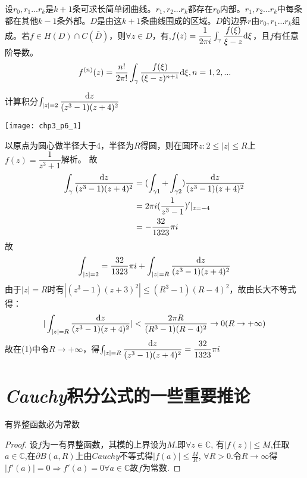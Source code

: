 \begin{mypro}
	设$r_0,r_1...r_k$是$k+1$条可求长简单闭曲线。$r_1,r_2...r_k$都存在$r_0$内部。$r_1,r_2...r_k$中每条都在其他$k-1$条外部。$D$是由这$k+1$条曲线围成的区域。$D$的边界$r$由$r_0,r_1...r_k$组成。若$f\in H(D)\cap C(\bar{D})$，则$\forall z\in D$，有,$f(z)=\dfrac{1}{2\pi i}\int_\gamma\dfrac{f(\xi)}{\xi-z}\mathrm{d}\xi$，且$f$有任意阶导数。
	\[f^{(n)}(z)=\dfrac{n!}{2\pi!}\int_\gamma\dfrac{f(\xi)}{(\xi-z)^{n+1}}\mathrm{d}\xi, n=1,2,...\]
\end{mypro}

\begin{eg}
	计算积分$\int_{|z|=2}\dfrac{\mathrm{d}z}{(z^3-1)(z+4)^2}$
	\begin{center}
		\texttt{[image: chp3\_p6\_1]}
	\end{center}
	
	以原点为圆心做半径大于4，半径为$R$得圆，则在圆环${z:2\leq|z|\leq R}$上$f(z)=\dfrac{1}{z^3+1}$解析。
	故
	\begin{align*}
	\int_\gamma\dfrac{\mathrm{d}z}{(z^3-1)(z+4)^2}&=(\int_{\gamma 1}+\int_{\gamma 2})\dfrac{\mathrm{d}z}{(z^3-1)(z+4)^2}\\
	&=2\pi i(\dfrac{1}{z^3-1})'|_{z=-4}\\
	&=-\dfrac{32}{1323}\pi i
	\end{align*}
	故\begin{equation}
	\int_{|z|=2}=\dfrac{32}{1323}\pi i+\int_{|z|=R}\dfrac{\mathrm{d}z}{(z^3-1)(z+4)^2}
	\end{equation}
	由于$|z|=R$时有$|(z^3-1)(z+3)^2|\leq(R^3-1)(R-4)^2$，故由长大不等式得：
	\[|\int_{|z|=R}\dfrac{\mathrm{d}z}{(z^3-1)(z+4)^2}|<\dfrac{2\pi R}{(R^3-1)(R-4)^2}\to 0(R\to+\infty)\]
	故在(1)中令$R\to+\infty$，得$\int_{|z|=R}\dfrac{\mathrm{d}z}{(z^3-1)(z+4)^2}=\dfrac{32}{1323}\pi i$
	
\end{eg}







\section{\emph{Cauchy}积分公式的一些重要推论}

\begin{mypro}
	有界整函数必为常数
\end{mypro}
\begin{proof}
	设$f$为一有界整函数，其模的上界设为$M$.即$\forall z\in\mathbb{C}$,
	有$|f(z)|\leq M$,任取$a\in\mathbb{C}$,在$\partial$$B(a,R)$上由$Cauchy$不等式得$\displaystyle{|f(a)|\le\frac{M}{R}}$,
	$\forall R>0$.令$R\rightarrow\infty$得$|f'(a)|=0\Rightarrow f'(a)=0\forall a\in\mathbb{C}$故$f$为常数.
\end{proof}


